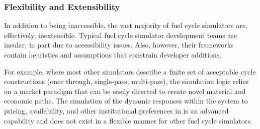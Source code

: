 \subsubsection{Flexibility and Extensibility}

In addition to being inaccessible, the vast majority of fuel cycle simulators
are, effectively, inextensible. Typical fuel cycle simulator development teams are insular, in
part due to accessibility issues. Also, however, their frameworks contain
heuristics and assumptions that constrain developer additions.

For example, where most other simulators describe a finite set of acceptable
cycle constructions (once through, single-pass, multi-pass), the \Cyclus
simulation logic relies on a market paradigm that can be easily directed to
create novel material and economic paths. The simulation of the dynamic
responses within the system to pricing, availability, and other institutional
preferences in \Cyclus is an advanced capability and does not exist in a
flexible manner for other fuel cycle simulators.

